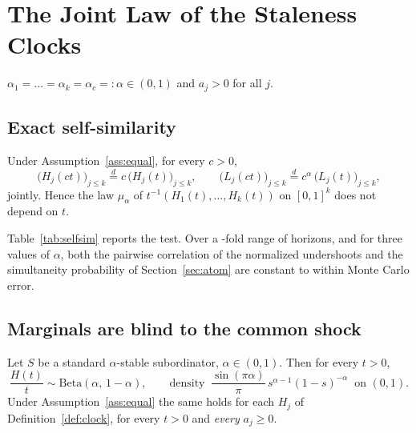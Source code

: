 \documentclass{ws-ijtaf}
\newcommand{\Bet}{\mathrm{Beta}}
\newcommand{\eqd}{\stackrel{d}{=}}
\begin{document}
\section{The Joint Law of the Staleness Clocks}\label{sec:joint}

\begin{assumption}\label{ass:equal}
$\alpha_1=\dots=\alpha_k=\alpha_c=:\alpha\in(0,1)$ and $a_j>0$ for all $j$.
\end{assumption}

\subsection{Exact self-similarity}

\begin{proposition}\label{prop:selfsim}
Under Assumption~\ref{ass:equal}, for every $c>0$,
\begin{equation}
\big(H_j(ct)\big)_{j\le k} \eqd c\,\big(H_j(t)\big)_{j\le k},
\qquad
\big(L_j(ct)\big)_{j\le k} \eqd c^{\alpha}\,\big(L_j(t)\big)_{j\le k},
\label{eq:selfsim}
\end{equation}
jointly. Hence the law $\mu_\alpha$ of $t^{-1}(H_1(t),\dots,H_k(t))$ on
$[0,1]^k$ does not depend on $t$.
\end{proposition}

Table~\ref{tab:selfsim} reports the test. Over a \simTratio{}-fold range of
horizons, and for three values of $\alpha$, both the pairwise correlation of the
normalized undershoots and the simultaneity probability of
Section~\ref{sec:atom} are constant to within Monte Carlo error.

\begin{table}[t]
{}
\label{tab:selfsim}
\end{table}

\subsection{Marginals are blind to the common shock}

\begin{proposition}\label{prop:beta}
Let $S$ be a standard $\alpha$-stable subordinator, $\alpha\in(0,1)$. Then for
every $t>0$,
\begin{equation}
\frac{H(t)}{t} \sim \Bet(\alpha,\,1-\alpha),
\qquad \text{density }\ \frac{\sin(\pi\alpha)}{\pi}\,
s^{\alpha-1}(1-s)^{-\alpha}\ \text{ on } (0,1).
\label{eq:beta}
\end{equation}
Under Assumption~\ref{ass:equal} the same holds for each $H_j$ of
Definition~\ref{def:clock}, for every $t>0$ and \emph{every} $a_j\ge0$.
\end{proposition}
\end{document}
